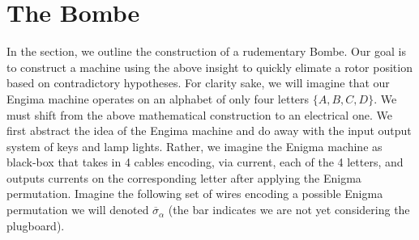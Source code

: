     \section{The Bombe}

    In the section, we outline the construction of a rudementary Bombe. Our goal is to construct a machine using the above insight to quickly elimate a rotor position based on contradictory hypotheses. For clarity sake, we will 
    imagine that our Engima machine operates on an alphabet of only four letters $\{A, B, C, D\}$.  
    We must shift from the above mathematical construction to an electrical one. We first abstract the idea of the Engima machine and do away with the input output system of keys and lamp lights.
    Rather, we imagine the Enigma machine as black-box that takes in 4 cables encoding, via current, each of the 4 letters, and outputs currents on the corresponding letter after applying the Enigma permutation.
    Imagine the following set of wires encoding a possible Enigma permutation we will denoted $\overline\sigma_\alpha$ (the bar indicates we are not yet considering the plugboard).
    

